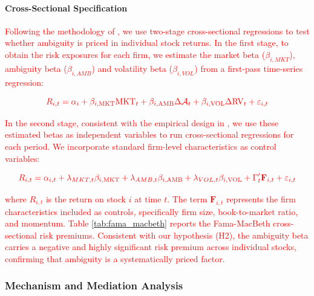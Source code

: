\documentclass[preprint,12pt,authoryear]{elsarticle}
\begin{document}
\paragraph{Cross-Sectional Specification}
\textcolor{red}{
Following the methodology of \citet{famaRiskReturnEquilibrium1973}, we use two-stage cross-sectional regressions to test whether ambiguity is priced in individual stock returns. In the first stage, to obtain the risk exposures for each firm, we estimate the market beta ($\beta_{i,MKT}$), ambiguity beta ($\beta_{i,AMB}$) and volatility beta ($\beta_{i,VOL}$) from a first-pass time-series regression:}

\begin{equation}
\textcolor{red}{
R_{i,t} = \alpha_i + \beta_{i,\text{MKT}} \text{MKT}_t + \beta_{i,\text{AMB}} \Delta \mathcal{A}_t + \beta_{i,\text{VOL}} \Delta \text{RV}_t + \varepsilon_{i,t}
}
\end{equation}

\textcolor{red}{In the second stage, consistent with the empirical design in \citet{Fama1992Cross}, we use these estimated betas as independent variables to run cross-sectional regressions for each period. We incorporate standard firm-level characteristics as control variables:}

\begin{equation}
\textcolor{red}{
R_{i,t} = \alpha_{i,t} + \lambda_{MKT,t} \beta_{i,\text{MKT}} + \lambda_{AMB,t} \beta_{i,\text{AMB}} + \lambda_{VOL,t} \beta_{i,\text{VOL}} + \Gamma_{t}' \mathbf{F}_{i,t} + \varepsilon_{i,t}
}
\end{equation}

\textcolor{red}{where $R_{i,t}$ is the return on stock $i$ at time $t$. The term $\mathbf{F}_{i,t}$ represents the firm characteristics included as controls, specifically firm size, book-to-market ratio, and momentum. Table \ref{tab:fama_macbeth} reports the Fama-MacBeth cross-sectional risk premiums. Consistent with our hypothesis (H2), the ambiguity beta carries a negative and highly significant risk premium across individual stocks, confirming that ambiguity is a systematically priced factor.}

\subsubsection{Mechanism and Mediation Analysis}
\end{document}
